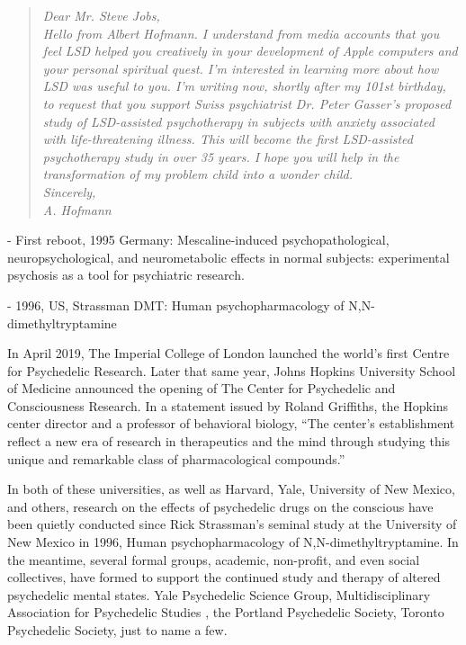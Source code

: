\documentclass{UIdahoMastersThesis}
\begin{document}
\begin{quote}
\textit{{Dear Mr. Steve Jobs,\\
Hello from Albert Hofmann. I understand from media accounts that you feel LSD helped you creatively in your development of Apple computers and your personal spiritual quest. I'm interested in learning more about how LSD was useful to you.
I'm writing now, shortly after my 101st birthday, to request that you support Swiss psychiatrist Dr. Peter Gasser's proposed study of LSD-assisted psychotherapy in subjects with anxiety associated with life-threatening illness. This will become the first LSD-assisted psychotherapy study in over 35 years.
I hope you will help in the transformation of my problem child into a wonder child.\\
Sincerely,\\
A. Hofmann}}
\end{quote}

\begin{snugshade*}
- First reboot, 1995 Germany:
Mescaline-induced psychopathological, neuropsychological, and neurometabolic effects in normal subjects: experimental psychosis as a tool for psychiatric research.
\end{snugshade*}

\begin{snugshade*}
- 1996, US, Strassman DMT:
Human psychopharmacology of N,N-dimethyltryptamine
\end{snugshade*}



In April 2019, The Imperial College of London launched the world's first Centre for Psychedelic Research. Later that same year, Johns Hopkins University School of Medicine announced the opening of The Center for Psychedelic and Consciousness Research. In a statement issued by Roland Griffiths, the Hopkins center director and a professor of behavioral biology, \enquote{The center's establishment reflect a new era of research in therapeutics and the mind through studying this unique and remarkable class of pharmacological compounds.}

In both of these universities, as well as Harvard, Yale, University of New Mexico, and others, research on the effects of psychedelic drugs on the conscious have been quietly conducted since Rick Strassman's seminal study at the University of New Mexico in 1996, Human psychopharmacology of N,N-dimethyltryptamine. In the meantime, several formal groups, academic, non-profit, and even social collectives, have formed to support the continued study and therapy of altered psychedelic mental states.  Yale Psychedelic Science Group, Multidisciplinary Association for Psychedelic Studies  , the Portland Psychedelic Society, Toronto Psychedelic Society, just to name a few.
\end{document}
